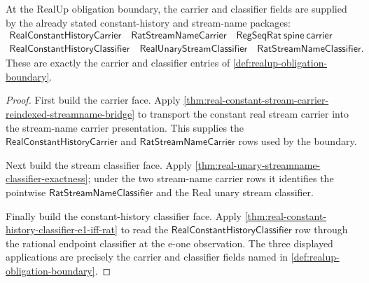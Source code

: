 \begin{theorem}
\label{thm:realup-carrier-classifier-obligations}
At the RealUp obligation boundary, the carrier and classifier fields are
supplied by the already stated constant-history and stream-name packages:
$$
\begin{array}{l}
\mathsf{RealConstantHistoryCarrier}\quad
\mathsf{RatStreamNameCarrier}\quad
\mathsf{RegSeqRat\ spine\ carrier}\\
\mathsf{RealConstantHistoryClassifier}\quad
\mathsf{RealUnaryStreamClassifier}\quad
\mathsf{RatStreamNameClassifier}.
\end{array}
$$
These are exactly the carrier and classifier entries of
\autoref{def:realup-obligation-boundary}.
\end{theorem}
\begin{proof}
First build the carrier face. Apply
\autoref{thm:real-constant-stream-carrier-reindexed-streamname-bridge} to
transport the constant real stream carrier into the stream-name carrier
presentation. This supplies the $\mathsf{RealConstantHistoryCarrier}$ and
$\mathsf{RatStreamNameCarrier}$ rows used by the boundary.

Next build the stream classifier face. Apply
\autoref{thm:real-unary-streamname-classifier-exactness}; under the two
stream-name carrier rows it identifies the pointwise
$\mathsf{RatStreamNameClassifier}$ and the Real unary stream classifier.

Finally build the constant-history classifier face. Apply
\autoref{thm:real-constant-history-classifier-e1-iff-rat} to read the
$\mathsf{RealConstantHistoryClassifier}$ row through the rational endpoint
classifier at the e-one observation. The three displayed applications are
precisely the carrier and classifier fields named in
\autoref{def:realup-obligation-boundary}.
\end{proof}

